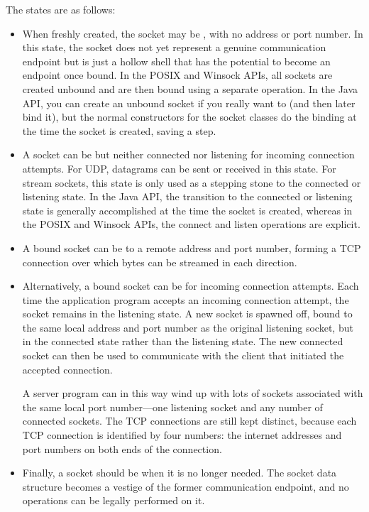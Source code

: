The states are as follows:
\begin{itemize}
\item
When freshly created, the socket may be , with no address or
port number.  In this state, the socket does not yet represent a
genuine communication endpoint but is just a hollow shell that has
the potential to become an endpoint once bound.  In the POSIX and
Winsock APIs, all sockets are created unbound and are then bound using
a separate operation.  In the Java API, you can create an unbound
socket if you really want to (and then later bind it), but the normal
constructors for the socket classes do the binding at the time the
socket is created, saving a step.
\item
A socket can be  but neither connected nor listening for
incoming connection attempts.  For UDP, datagrams can be sent or
received in this state.  For stream sockets, this state is only used
as a stepping stone to the connected or listening state.  In the Java
API, the transition to the connected or listening state is generally
accomplished at the time the socket is created, whereas in the POSIX
and Winsock APIs, the connect and listen operations are explicit.
\item
A bound socket can be  to a remote address and port number,
forming a TCP connection over which bytes can be streamed in each
direction.
\item
Alternatively, a bound socket can be  for incoming connection
attempts.  Each time the application program accepts an incoming
connection attempt, the socket remains in the listening state.  A
new socket is spawned off, bound to the same local address and port
number as the original listening socket, but in the connected state
rather than the listening state.  The new connected socket can then be
used to communicate with the client that initiated the accepted
connection.

A server program can in this way wind up with lots of
sockets associated with the same local port number---one listening
socket and any number of connected sockets.  The TCP
connections are still kept distinct, because each TCP connection is
identified by four numbers: the internet addresses and port numbers on
both ends of the connection.
\item
Finally, a socket should be  when it is no longer needed.  The
socket data structure becomes a vestige of the former
communication endpoint, and no operations can be legally performed on
it.
\end{itemize}

